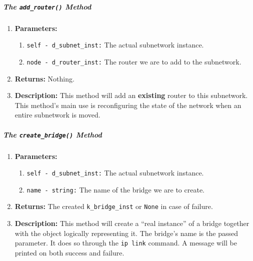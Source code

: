                     \subparagraph{The \texttt{add\_router()} Method}
                        \begin{enumerate}
                            \item \textbf{Parameters:}
                            \begin{enumerate}
                                \item \texttt{self - d\_subnet\_inst:} The actual subnetwork instance.
                                \item \texttt{node - d\_router\_inst:} The router we are to add to the subnetwork.
                            \end{enumerate}
                            \item \textbf{Returns:} Nothing.
                            \item \textbf{Description:} This method will add an \textbf{existing} router to this subnetwork. This method's main use is reconfiguring the state of the network when an entire subnetwork is moved.
                        \end{enumerate}

                    \subparagraph{The \texttt{create\_bridge()} Method}
                        \begin{enumerate}
                            \item \textbf{Parameters:}
                            \begin{enumerate}
                                \item \texttt{self - d\_subnet\_inst:} The actual subnetwork instance.
                                \item \texttt{name - string:} The name of the bridge we are to create.
                            \end{enumerate}
                            \item \textbf{Returns:} The created \texttt{k\_bridge\_inst} or \texttt{None} in case of failure.
                            \item \textbf{Description:} This method will create a ``real instance'' of a bridge together with the object logically representing it. The bridge's name is the passed parameter. It does so through the \texttt{ip link} command. A message will be printed on both success and failure.
                        \end{enumerate}

